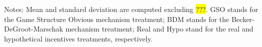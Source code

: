 \documentclass[12pt]{article}
\begin{document}
            \begin{table}[htbp]
                \centering
                \caption{Descriptive Statistics by Treatment 
                (excluding excluding MS (R1: 14.31\%, R2, 9.6\%, R3: 3.87\%)
)}
                \label{tab:Appendix_descrip_2}
\begin{tablenotes}
            \footnotesize
            
            \item Notes: Mean and standard deviation are computed excluding \hl{???}. GSO stands for the Game Structure Obvious mechanism treatment; BDM stands for the Becker-DeGroot-Marschak mechanism treatment; Real and Hypo stand for the real and hypothetical incentives treatments, respectively.
        \end{tablenotes}
            \end{table}
       
     
\clearpage
  
\end{document}
